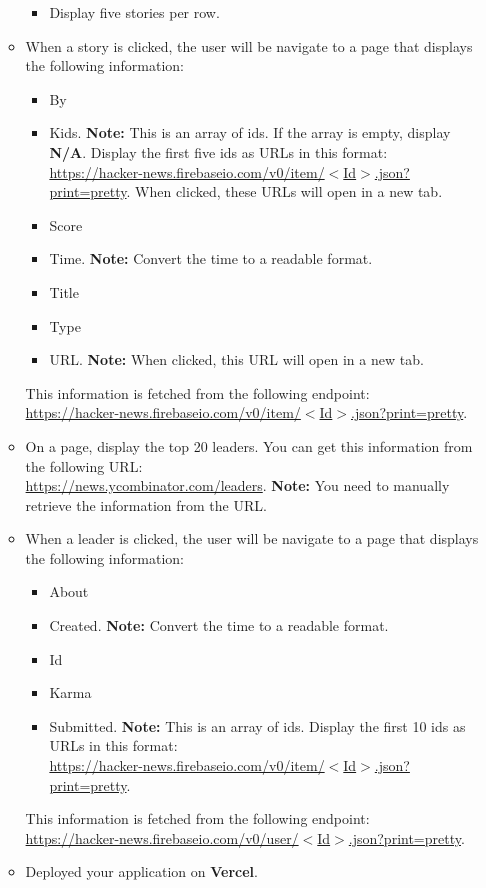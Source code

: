 \documentclass{article}
\begin{document}
\begin{itemize}
\begin{itemize}
\begin{itemize}
		\item Display five stories per row.
	\end{itemize}
	\item When a story is clicked, the user will be navigate to a page that displays the following information:
	\begin{itemize}
		\item By
		\item Kids. \textbf{Note:} This is an array of ids. If the array is empty, display \textbf{N/A}. Display the first five ids as URLs in this format: \href{https://hacker-news.firebaseio.com/v0/item/$<$Id$>$.json?print=pretty}{https://hacker-news.firebaseio.com/v0/item/$<$Id$>$.json?print=pretty}. When clicked, these URLs will open in a new tab. 
		\item Score
		\item Time. \textbf{Note:} Convert the time to a readable format.
		\item Title
		\item Type 
		\item URL. \textbf{Note:} When clicked, this URL will open in a new tab.
	\end{itemize}
	This information is fetched from the following endpoint:\\
	\href{https://hacker-news.firebaseio.com/v0/item/$<$Id$>$.json?print=pretty}{https://hacker-news.firebaseio.com/v0/item/$<$Id$>$.json?print=pretty}.
	\item On a page, display the top 20 leaders. You can get this information from the following URL:\\
	\href{https://news.ycombinator.com/leaders}{https://news.ycombinator.com/leaders}. \textbf{Note:} You need to manually retrieve the information from the URL. 
	\item When a leader is clicked, the user will be navigate to a page that displays the following information:
	\begin{itemize}
		\item About
		\item Created. \textbf{Note:} Convert the time to a readable format.
		\item Id
		\item Karma
		\item Submitted. \textbf{Note:} This is an array of ids. Display the first 10 ids as URLs in this format:\\
		 \href{https://hacker-news.firebaseio.com/v0/item/$<$Id$>$.json?print=pretty}{https://hacker-news.firebaseio.com/v0/item/$<$Id$>$.json?print=pretty}.
	\end{itemize}
	This information is fetched from the following endpoint:\\
	\href{https://hacker-news.firebaseio.com/v0/user/$<$Id$>$.json?print=pretty}{https://hacker-news.firebaseio.com/v0/user/$<$Id$>$.json?print=pretty}.
	\item Deployed your application on \textbf{Vercel}. 
\end{itemize}


\end{itemize}
\end{document}
